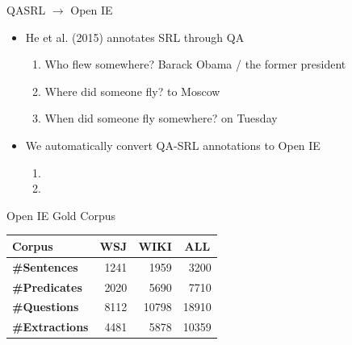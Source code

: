 \documentclass[final]{beamer}
\newcommand{\commonvspace}[0]{\vspace{1cm}}
\begin{document}
\begin{frame}{}
\begin{textblock}{39}
\begin{block}{QASRL $\rightarrow$ Open IE}
  \begin{itemize}
        \setlength\itemsep{1em}
  \item He et al. (2015) annotates \alert{SRL} through QA
    \\ 
    \begin{enumerate}
    \item Who flew somewhere? \alert{Barack Obama} / \alert{the former president}
    \item Where did someone fly?  \alert{to Moscow}
    \item When did someone fly somewhere? \alert{on Tuesday}
    \end{enumerate}
  \item We \alert{automatically} convert QA-SRL annotations to Open IE
    \begin{enumerate}
    \item {}
    \item {}
    \end{enumerate}
  \end{itemize}
\end{block}

\commonvspace

\begin{block}{Open IE Gold Corpus}
  \begin{table}
    \begin{tabular}{lrrr}
      \hline
      \textbf{Corpus}        & \multicolumn{1}{c}{\textbf{WSJ}} & \multicolumn{1}{c}{\textbf{WIKI}} & \multicolumn{1}{c}{\textbf{ALL}} \\ \hline
      \textbf{\#Sentences}   & 1241                              & 1959                               & 3200                              \\ 
      \textbf{\#Predicates}  & 2020                              & 5690                               & 7710                              \\ 
      \textbf{\#Questions}   & 8112                              & 10798                              & 18910                             \\ 
      \textbf{\#Extractions} & 4481                     & 5878                      & 10359                    \\ \hline
    \end{tabular}
    \label{tab:cstats}
  \end{table}
\end{block}


\end{textblock}
\end{frame}
\end{document}
